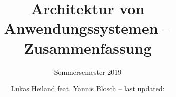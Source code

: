 \documentclass[9pt]{scrreprt}
\begin{document}
	
	\title{Architektur von Anwendungssystemen -- Zusammenfassung}
	\subtitle{Sommersemester 2019}
	\author{Lukas Heiland feat. Yannis Blosch -- last updated:}
	
	\maketitle
	
	\pagebreak
	
	\setcounter{tocdepth}{1}
	\tableofcontents
	
	\pagebreak
	
	
	
	
		
		\pagebreak
		
	
	
		\pagebreak
		
	
	
		\pagebreak
		
	
	
		\pagebreak
		
	
	
		\pagebreak
		
	
	
		\pagebreak
		
	
\end{document}
